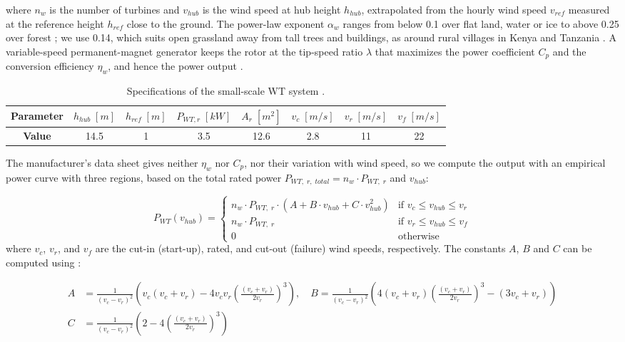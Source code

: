 \documentclass[final,3p,times]{elsarticle}
\begin{document}
\noindent where $n_w$ is the number of turbines and $v_{hub}$ is the wind speed at hub height $h_{hub}$, extrapolated from the hourly wind speed $v_{ref}$ measured at the reference height $h_{ref}$ close to the ground. The power-law exponent $\alpha_w$ ranges from below 0.1 over flat land, water or ice to above 0.25 over forest \cite{kaabeche2011a}; we use 0.14, which suits open grassland away from tall trees and buildings, as around rural villages in Kenya and Tanzania \cite{kaviani2009}. A variable-speed permanent-magnet generator keeps the rotor at the tip-speed ratio $\lambda$ that maximizes the power coefficient $C_p$ and the conversion efficiency $\eta_w$, and hence the power output \cite{seeling1997}.

\begin{table}[htbp]
\centering
\begin{tabular}{@{}cccccccc@{}}
\toprule
\textbf{Parameter} & $h_{hub} \; [m]$ & $h_{ref} \; [m]$ & $P_{WT,r} \; [kW]$ & $A_r \; [m^2]$ & $v_c \; [m/s]$ & $v_r \; [m/s]$ & $v_f \; [m/s]$ \\ \midrule
\textbf{Value}    & 14.5              & 1                  & 3.5                    & 12.6                                                & 2.8                & 11                                         & 22 \\ \bottomrule
\end{tabular}
\caption{Specifications of the small-scale WT system \cite{raum}.}
\label{tab:wt_spec}
\end{table}

The manufacturer's data sheet gives neither $\eta_w$ nor $C_p$, nor their variation with wind speed, so we compute the output with an empirical power curve with three regions, based on the total rated power $P_{WT,\;r,\; total} = n_w \cdot P_{WT,\;r}$ and $v_{hub}$:

\[
 P_{WT}(v_{hub}) = 
  \begin{cases} 
   n_w \cdot P_{WT,\;r} \cdot (A + B\cdot v_{hub} + C \cdot v_{hub}^2) & \text{if } v_c \leq v_{hub} \leq v_{r} \\
   n_w \cdot P_{WT,\;r}      & \text{if } v_{r} \leq v_{hub} \leq v_{f} \\
   0 & \text{otherwise}
  \end{cases}
\]
where $v_c$, $v_r$, and $v_f$ are the cut-in (start-up), rated, and cut-out (failure) wind speeds, respectively. The constants $A$, $B$ and $C$ can be computed using \cite{wen2009}:

\begin{align*}
    A & = \frac{1}{(v_c - v_r)^2} \left(v_c(v_c + v_r) - 4 v_c v_r \left(\frac{(v_c + v_r)}{2v_r}\right)^3 \right), \quad B = \frac{1}{(v_c - v_r)^2} \left(4 (v_c + v_r) \left(\frac{(v_c + v_r)}{2v_r}\right)^3 - (3v_c + v_r)\right) \\
    C & = \frac{1}{(v_c - v_r)^2} \left(2 - 4 \left(\frac{(v_c + v_r)}{2v_r}\right)^3 \right)
\end{align*}
\end{document}
